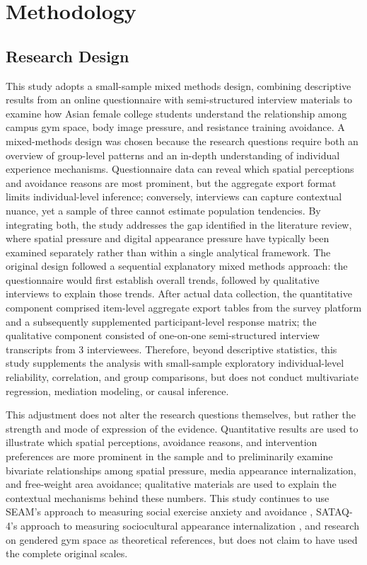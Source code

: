 \section{Methodology}

\subsection{Research Design}

This study adopts a small-sample mixed methods design, combining descriptive results from an online questionnaire with semi-structured interview materials to examine how Asian female college students understand the relationship among campus gym space, body image pressure, and resistance training avoidance.
A mixed-methods design was chosen because the research questions require both an overview of group-level patterns and an in-depth understanding of individual experience mechanisms.
Questionnaire data can reveal which spatial perceptions and avoidance reasons are most prominent, but the aggregate export format limits individual-level inference; conversely, interviews can capture contextual nuance, yet a sample of three cannot estimate population tendencies.
By integrating both, the study addresses the gap identified in the literature review, where spatial pressure and digital appearance pressure have typically been examined separately rather than within a single analytical framework.
The original design followed a sequential explanatory mixed methods approach: the questionnaire would first establish overall trends, followed by qualitative interviews to explain those trends.
After actual data collection, the quantitative component comprised item-level aggregate export tables from the survey platform and a subsequently supplemented participant-level response matrix; the qualitative component consisted of one-on-one semi-structured interview transcripts from 3 interviewees.
Therefore, beyond descriptive statistics, this study supplements the analysis with small-sample exploratory individual-level reliability, correlation, and group comparisons, but does not conduct multivariate regression, mediation modeling, or causal inference.

This adjustment does not alter the research questions themselves, but rather the strength and mode of expression of the evidence.
Quantitative results are used to illustrate which spatial perceptions, avoidance reasons, and intervention preferences are more prominent in the sample and to preliminarily examine bivariate relationships among spatial pressure, media appearance internalization, and free-weight area avoidance; qualitative materials are used to explain the contextual mechanisms behind these numbers.
This study continues to use SEAM's approach to measuring social exercise anxiety and avoidance \parencite{levinson2013seam}, SATAQ-4's approach to measuring sociocultural appearance internalization \parencite{schaefer2015sataq4}, and research on gendered gym space \parencite{turnock2021gyms,rendall2024gym} as theoretical references, but does not claim to have used the complete original scales.

